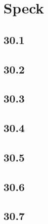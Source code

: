 \part{Speck}

 \chapter{30.1}

 \chapter{30.2}

 \chapter{30.3}

 \chapter{30.4}

 \chapter{30.5}

 \chapter{30.6}

 \chapter{30.7}








